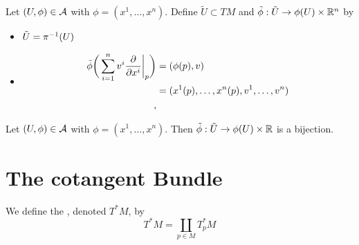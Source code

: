 \documentclass{book}
\begin{document}
	\begin{defn}
		Let $(U, \phi) \in \mathcal{A}$ with $\phi = (x^1, \dots, x^n)$. Define $\tilde{U} \subset TM$ and $\tilde{\phi}: \tilde{U} \rightarrow \phi(U) \times \mathbb{R}^{n}$ by  
		\begin{itemize}
			\item $\tilde{U} = \pi^{-1}(U)$
			\item 
			\begin{align*}
				\tilde{\phi} \bigg(\sum\limits_{i =1}^n v^i \frac{\partial}{\partial x^i} \bigg|_p \bigg) 
				&= (\phi(p), v) \\
				&= (x^1(p), \dots, x^n(p), v^1, \dots, v^n) \\
, 			\end{align*}
		\end{itemize}
	\end{defn}

	\begin{ex}
		Let $(U, \phi) \in \mathcal{A}$ with $\phi = (x^1, \dots, x^n)$. Then $\tilde{\phi}:\tilde{U} \rightarrow \phi(U) \times \mathbb{R}$ is a bijection. 
	\end{ex}





























	\newpage
	\section{The cotangent Bundle}
	
	\begin{defn}
		We define the , denoted $T^*M$, by 
		$$T^*M = \coprod_{p \in M} T_p^*M$$ 
	\end{defn}













	
	
	
	
	
	
\end{document}
